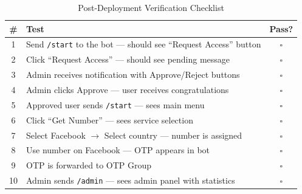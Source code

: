 \begin{table}[H]
\centering
\caption{Post-Deployment Verification Checklist}
\begin{tabularx}{\textwidth}{|c|X|c|}
\hline
\textbf{\#} & \textbf{Test} & \textbf{Pass?} \\
\hline
1 & Send \texttt{/start} to the bot --- should see ``Request Access'' button & $\square$ \\
\hline
2 & Click ``Request Access'' --- should see pending message & $\square$ \\
\hline
3 & Admin receives notification with Approve/Reject buttons & $\square$ \\
\hline
4 & Admin clicks Approve --- user receives congratulations & $\square$ \\
\hline
5 & Approved user sends \texttt{/start} --- sees main menu & $\square$ \\
\hline
6 & Click ``Get Number'' --- sees service selection & $\square$ \\
\hline
7 & Select Facebook $\rightarrow$ Select country --- number is assigned & $\square$ \\
\hline
8 & Use number on Facebook --- OTP appears in bot & $\square$ \\
\hline
9 & OTP is forwarded to OTP Group & $\square$ \\
\hline
10 & Admin sends \texttt{/admin} --- sees admin panel with statistics & $\square$ \\
\hline
\end{tabularx}
\end{table}
